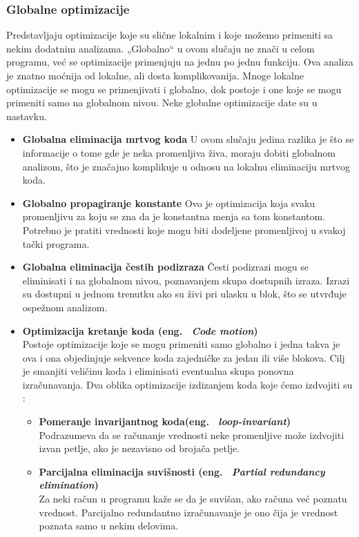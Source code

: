 \documentclass[a4paper]{article}
\begin{document}
\subsubsection{Globalne optimizacije}
\label{subsubsec:globalne}
Predstavljaju optimizacije koje su slične lokalnim i koje možemo primeniti sa nekim dodatnim analizama.
„Globalno“ u ovom slučaju ne znači u celom programu, već se optimizacije primenjuju na jednu po jednu funkciju. 
Ova analiza je znatno moćnija od lokalne, ali dosta komplikovanija. 
Mnoge lokalne optimizacije se  mogu se primenjivati i globalno, dok postoje i one koje se mogu primeniti samo na globalnom nivou.
Neke globalne optimizacije date su u nastavku.

\begin{itemize}
  \item \textbf{Globalna eliminacija mrtvog koda} \newline
  U ovom slučaju jedina razlika je što se informacije o tome gde je neka promenljiva živa, moraju dobiti globalnom analizom, što je značajno komplikuje u odnosu na lokalnu eliminaciju mrtvog koda.
  \item \textbf{Globalno propagiranje konstante} \newline
  Ovo je optimizacija koja svaku promenljivu za koju se zna da je konstantna menja sa tom konstantom.
  Potrebno je pratiti vrednosti koje mogu biti dodeljene promenljivoj u svakoj tački programa. 
  \item \textbf{Globalna eliminacija čestih podizraza} \newline
  Česti podizrazi mogu se eliminisati  i na globalnom nivou, poznavanjem skupa dostupnih izraza.
  Izrazi su dostupni u jednom trenutku ako su živi pri ulasku u blok, što se utvrđuje ospežnom analizom.
  \item \textbf{Optimizacija kretanje koda (eng. ~{\em Code motion})} \\
  Postoje optimizacije koje se mogu primeniti samo globalno i jedna takva je ova i ona objedinjuje sekvence koda zajedničke za jedan ili više blokova. 
  Cilj je smanjiti veličinu koda i eliminisati eventualna skupa ponovna izračunavanja. 
  Dva oblika optimizacije izdizanjem koda koje ćemo izdvojiti su :
  \begin{itemize}
    \item \textbf{Pomeranje invarijantnog koda(eng. ~{\em loop-invariant})} \\
       Podrazumeva da se računanje vrednosti neke promenljive može izdvojiti izvan petlje, ako je nezavisno od brojača petlje.
    \item \textbf{Parcijalna eliminacija suvišnosti (eng. ~{\em Partial redundancy elimination})} \\
    Za neki račun u programu kaže se da je suvišan, ako računa već poznatu vrednost. 
    Parcijalno redundantno izračunavanje  je ono čija je vrednost poznata samo u nekim delovima. \cite{stanford}
    
  \end{itemize}
\end{itemize}
\end{document}
